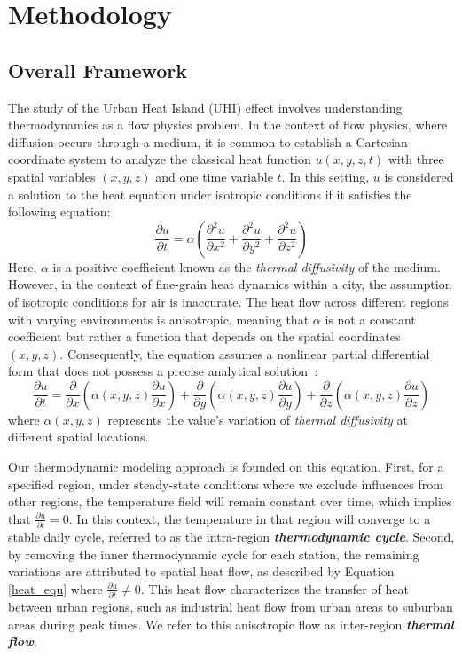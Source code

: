 \section{Methodology}
\label{sec:solution}



\subsection{Overall Framework}
 The study of the Urban Heat Island (UHI) effect involves understanding thermodynamics as a flow physics problem. In the context of flow physics, where diffusion occurs through a medium, it is common to establish a Cartesian coordinate system to analyze the classical heat function $u(x,y,z,t)$ with three spatial variables $(x,y,z)$ and one time variable $t$. In this setting, $u$ is considered a solution to the heat equation under isotropic conditions if it satisfies the following equation:
\begin{equation}
\frac{\partial u}{\partial t}=\alpha\left(\frac{\partial^2 u}{\partial x^2}+\frac{\partial^2 u}{\partial y^2}+\frac{\partial^2 u}{\partial z^2}\right)
\end{equation}
Here, $\alpha$ is a positive coefficient known as the \textit{thermal diffusivity} of the medium. However, in the context of fine-grain heat dynamics within a city, the assumption of isotropic conditions for air is inaccurate. The heat flow across different regions with varying environments is anisotropic, meaning that $\alpha$ is not a constant coefficient but rather a function that depends on the spatial coordinates $(x,y,z)$. Consequently, the equation assumes a nonlinear partial differential form that does not possess a precise analytical solution~\cite{reitzle2019semi}:
\begin{equation}
\label{heat_equ}
\frac{\partial u}{\partial t}=\frac{\partial}{\partial x}\left(\alpha(x, y, z) \frac{\partial u}{\partial x}\right)+\frac{\partial}{\partial y}\left(\alpha(x, y, z) \frac{\partial u}{\partial y}\right)+\frac{\partial}{\partial z}\left(\alpha(x, y, z) \frac{\partial u}{\partial z}\right)
\end{equation}
where $\alpha(x, y, z)$ represents the value's variation of \textit{thermal diffusivity} at different spatial locations.

Our thermodynamic modeling approach is founded on this equation. First, for a specified region, under steady-state conditions where we exclude influences from other regions, the temperature field will remain constant over time, which implies that $\frac{\partial u}{\partial t}=0$. In this context, the temperature in that region will converge to a stable daily cycle, referred to as the intra-region \textbf{\textit{thermodynamic cycle}}. 
Second, by removing the inner thermodynamic cycle for each station, the remaining variations are attributed to spatial heat flow, as described by Equation \ref{heat_equ} where $\frac{\partial u}{\partial t}\neq 0$. This heat flow characterizes the transfer of heat between urban regions, such as industrial heat flow from urban areas to suburban areas during peak times. We refer to this anisotropic flow as inter-region \textbf{\textit{thermal flow}}.


